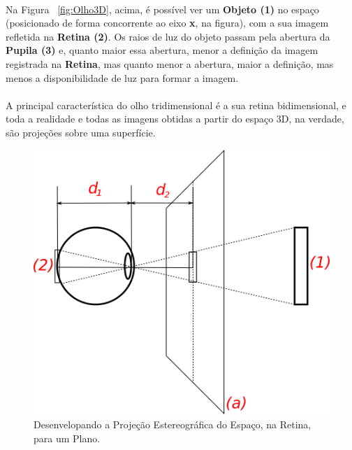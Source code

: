 \documentclass{article}
\begin{document}
	\paragraph{}
	Na Figura ~\ref{fig:Olho3D}, acima, é possível ver um  \textbf{Objeto (1)} no espaço (posicionado de forma concorrente ao eixo \textbf{x}, na figura), com a sua imagem refletida na \textbf{Retina (2)}. Os raios de luz do objeto passam pela abertura da \textbf{Pupila (3)} e, quanto maior essa abertura, menor a definição da imagem registrada na \textbf{Retina}, mas quanto menor a abertura, maior a definição, mas menos a disponibilidade de luz para formar a imagem.
	
	\paragraph{}
	A principal característica do olho tridimensional é a sua retina bidimensional, e toda a realidade e todas as imagens obtidas a partir do espaço 3D, na verdade, são projeções sobre uma superfície.
	
	\begin{figure}[h]
		\centering
		\includegraphics[scale=0.7]{Desenvelope-Da-Retina}
		\caption{Desenvelopando a Projeção Estereográfica do Espaço, na Retina, para um Plano.}
		\label{fig:DesenvelopeRetina3D}
	\end{figure}
	
\end{document}
